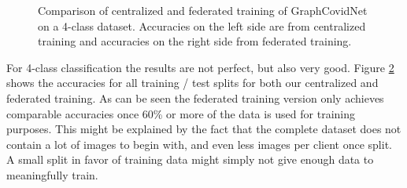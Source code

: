 \begin{figure}[htbp]
\begin{subfigure}{.45\textwidth}
      \label{fig:graphcovidnet_4_class_accuracies_fed}
    \end{subfigure}
    \caption{Comparison of centralized and federated training of GraphCovidNet on a 4-class dataset. Accuracies on the left side are from centralized training and accuracies on the right side from federated training.}
    \label{fig:graphcovidnet_4_class_accuracies}
\end{figure}

For 4-class classification the results are not perfect, but also very good. Figure \ref{fig:graphcovidnet_4_class_accuracies} shows the accuracies for all training / test splits for both our centralized and federated training. As can be seen the federated training version only achieves comparable accuracies once 60\% or more of the data is used for training purposes. This might be explained by the fact that the complete dataset does not contain a lot of images to begin with, and even less images per client once split. A small split in favor of training data might simply not give enough data to meaningfully train.